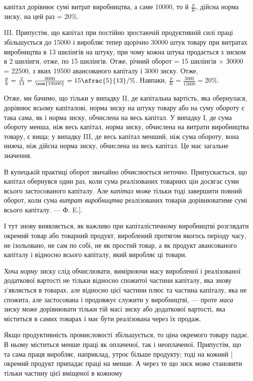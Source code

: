 \parcont{}  %
капітал дорівнює сумі витрат виробництва, а саме \num{10000}, то й $\frac{p}{K}$, дійсна норма
зиску, на цей раз = 20\%.

III. Припустім, що капітал при постійно зростаючій продуктивній силі праці збільшується до \num{15000} і виробляє тепер щорічно \num{30000} штук товару при витратах виробництва в 13 шилінгів
на штуку, при чому кожна штука продається з зиском в 2 шилінги, отже, по 15 шилінгів. Отже, річний
оборот = 15 шилінгів × З0000 = \num{22500}, з яких \num{19500}
авансованого капіталу і 3000 зиску. Отже,
$\frac{p}{k} = \frac{2}{13} = \frac{3000}{\num{19500}} = 15\sfrac{5}{13}/\%$.
Навпаки, $\frac{p}{K} = \frac{3000}{\num{15000}} = 20\%$.

Отже, ми бачимо, що тільки у випадку II, де капітальна вартість, яка обернулася, дорівнює всьому
капіталові, норма зиску на штуку товару або на суму обороту є така сама, як і норма зиску, обчислена
на весь капітал. У випадку І, де сума обороту менша, ніж весь капітал, норма зиску, обчислена на
витрати виробництва товару, є вища; у випадку III, де весь капітал менший, ніж сума обороту, вона
нижча, ніж дійсна норма зиску, обчислена на весь капітал. Це має загальне значення.

В купецькій практиці оборот звичайно обчислюється неточно. Припускається, що капітал обернувся один
раз, коли сума реалізованих товарних цін досягає суми всього застосованого капіталу. Але \emph{капітал}
може тільки тоді завершити повний оборот, коли сума \emph{витрат виробництва} реалізованих товарів
дорівнюватиме сумі всього капіталу. — Ф. E.].

І тут знову виявляється, як важливо при капіталістичному виробництві розглядати окремий товар або
товарний продукт, вироблений протягом якогось періоду часу, не ізольовано, не сам по собі, не як
простий товар, а як продукт авансованого капіталу і відносно всього капіталу, який виробляє ці
товари.

Хоча \emph{норму} зиску слід обчислювати, вимірюючи масу виробленої і реалізованої додаткової вартості не
тільки відносно спожитої частини капіталу, яка знову з’являється в товарах, але відносно цієї
частини плюс та частина капіталу, яка не спожита, але застосована і продовжує служити у виробництві,
— проте \emph{маса} зиску може дорівнювати тільки тій масі зиску або додаткової вартості, яка міститься в
самих товарах і має бути реалізована через їх продаж.

Якщо продуктивність промисловості збільшується, то ціна окремого товару падає. В ньому міститься
менше праці як оплаченої, так і неоплаченої. Припустім, що та сама праця виробляє, наприклад, утроє
більше продукту; тоді на кожний | окремий продукт припадає праці на  менше. А через те що зиск
може становити тільки частину цієї вміщеної в кожному
\parbreak{}  %
